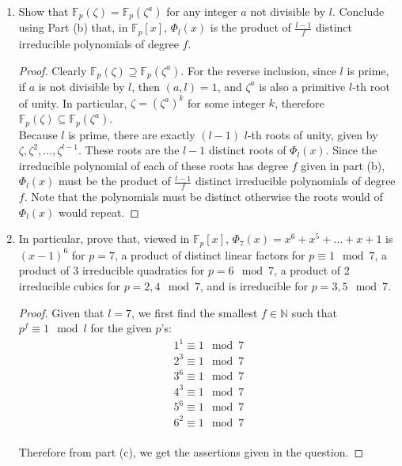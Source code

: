 \documentclass{article}
\begin{document}
\begin{enumerate}[label={(\alph*)}]
    \item Show that $\mathbb{F}_p(\zeta)=\mathbb{F}_p(\zeta^a)$ for any
      integer $a$ not divisible by $l$. Conclude using Part (b) that, in
      $\mathbb{F}_p[x]$, $\Phi_l(x)$ is the product of $\frac{l-1}{f}$
      distinct irreducible polynomials of degree $f$.

      \begin{proof}
        Clearly $\mathbb{F}_p(\zeta) \supseteq\mathbb{F}_p(\zeta^a)$. For
        the reverse inclusion, since $l$ is prime, if $a$ is not divisible
        by $l$, then $(a,l)=1$, and $\zeta^a$ is also a primitive $l$-th
        root of unity. In particular, $\zeta=(\zeta^a)^k$ for some integer
        $k$, therefore $\mathbb{F}_p(\zeta)
        \subseteq\mathbb{F}_p(\zeta^a)$. \\

        Because $l$ is prime, there are exactly $(l-1)$ $l$-th roots of
        unity, given by $\zeta,\zeta^2,\ldots,\zeta^{l-1}$. These roots are
        the $l-1$ distinct roots of $\Phi_l(x)$. Since the irreducible
        polynomial of each of these roots has degree $f$ given in part (b),
        $\Phi_l(x)$ must be the product of $\frac{l-1}{f}$ distinct
        irreducible polynomials of degree $f$. Note that the polynomials
        must be distinct otherwise the roots would of $\Phi_l(x)$ would
        repeat.
      \end{proof}

    \item In particular, prove that, viewed in $\mathbb{F}_p[x]$,
      $\Phi_7(x) =x^6+x^5+\ldots+x+1$ is $(x-1)^6$ for $p=7$, a product of
      distinct linear factors for $p\equiv1\mod 7$, a product of 3
      irreducible quadratics for $p=6\mod7$, a product of 2 irreducible
      cubics for $p=2,4\mod7$, and is irreducible for $p=3,5\mod7$.

      \begin{proof}
        Given that $l=7$, we first find the smallest $f\in\mathbb{N}$ such
        that $p^f\equiv1\mod l$ for the given $p$'s:
        \begin{align*}
          1^1\equiv 1\mod7 \\
          2^3\equiv 1\mod7 \\
          3^6\equiv 1\mod7 \\
          4^3\equiv 1\mod7 \\
          5^6\equiv 1\mod7 \\
          6^2\equiv 1\mod7 \\
        \end{align*}

        Therefore from part (c), we get the assertions given in the
        question.
      \end{proof}
  \end{enumerate}
\end{document}
